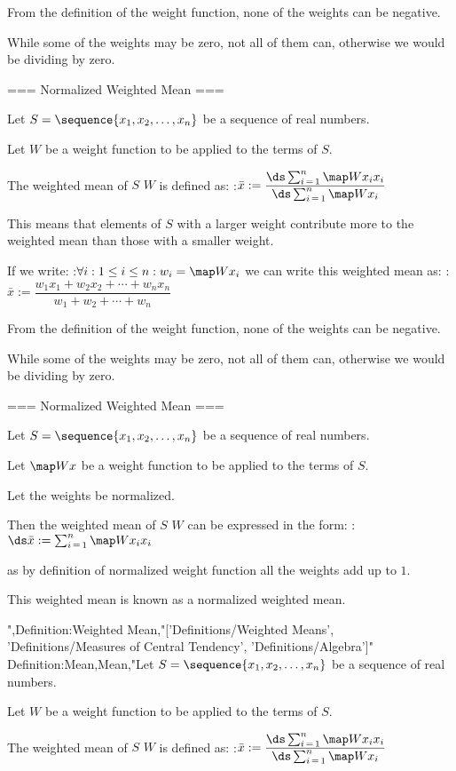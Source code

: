 From the definition of the weight function, none of the weights can be negative.

While some of the weights may be zero, not all of them can, otherwise we would be dividing by zero.


=== Normalized Weighted Mean ===

Let $S = \sequence {x_1, x_2, \ldots, x_n}$ be a sequence of real numbers.

Let $W$ be a weight function to be applied to the terms of $S$.


The weighted mean of $S$  $W$ is defined as:
:$\bar x := \dfrac {\ds \sum_{i \mathop = 1}^n \map W {x_i} x_i} {\ds \sum_{i \mathop = 1}^n \map W {x_i} }$

This means that elements of $S$ with a larger weight contribute more to the weighted mean than those with a smaller weight.


If we write:
:$\forall i: 1 \le i \le n: w_i = \map W {x_i}$
we can write this weighted mean as:
:$\bar x := \dfrac {w_1 x_1 + w_2 x_2 + \cdots + w_n x_n} {w_1 + w_2 + \cdots + w_n}$


From the definition of the weight function, none of the weights can be negative.

While some of the weights may be zero, not all of them can, otherwise we would be dividing by zero.


=== Normalized Weighted Mean ===

Let $S = \sequence {x_1, x_2, \ldots, x_n}$ be a sequence of real numbers.

Let $\map W x$ be a weight function to be applied to the terms of $S$.

Let the weights be normalized.

Then the weighted mean of $S$  $W$ can be expressed in the form:
:$\ds \bar x := \sum_{i \mathop = 1}^n \map W {x_i} x_i$

as by definition of normalized weight function all the weights add up to $1$.

This weighted mean is known as a  normalized weighted mean.



",Definition:Weighted Mean,"['Definitions/Weighted Means', 'Definitions/Measures of Central Tendency', 'Definitions/Algebra']"
Definition:Mean,Mean,"Let $S = \sequence {x_1, x_2, \ldots, x_n}$ be a sequence of real numbers.

Let $W$ be a weight function to be applied to the terms of $S$.


The weighted mean of $S$  $W$ is defined as:
:$\bar x := \dfrac {\ds \sum_{i \mathop = 1}^n \map W {x_i} x_i} {\ds \sum_{i \mathop = 1}^n \map W {x_i} }$

